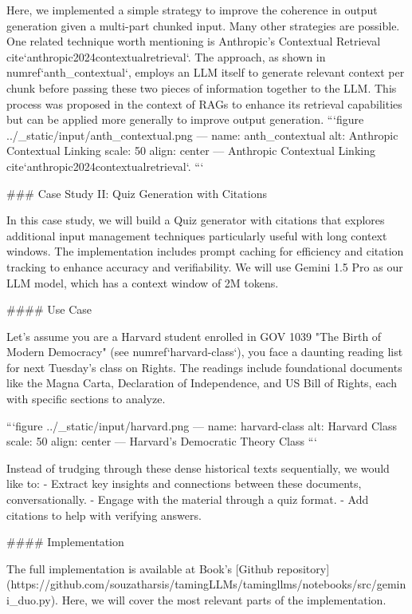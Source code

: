 {{Here, we implemented a simple strategy to improve the coherence in output generation given a multi-part chunked input. Many other strategies are possible. One related technique worth mentioning is Anthropic's Contextual Retrieval {cite}`anthropic2024contextualretrieval`. The approach, as shown in {numref}`anth_contextual`, employs an LLM itself to generate relevant context per chunk before passing these two pieces of information together to the LLM. This process was proposed in the context of RAGs to enhance its retrieval capabilities but can be applied more generally to improve output generation.
```{figure} ../_static/input/anth_contextual.png
---
name: anth_contextual
alt: Anthropic Contextual Linking
scale: 50%
align: center
---
Anthropic Contextual Linking {cite}`anthropic2024contextualretrieval`.
```

### Case Study II: Quiz Generation with Citations

In this case study, we will build a Quiz generator with citations that explores additional input management techniques particularly useful with long context windows. The implementation includes prompt caching for efficiency and citation tracking to enhance accuracy and verifiability. We will use Gemini 1.5 Pro as our LLM model, which has a context window of 2M tokens.

#### Use Case

Let's assume you are a Harvard student enrolled in GOV 1039 "The Birth of Modern Democracy" (see {numref}`harvard-class`), you face a daunting reading list for next Tuesday's class on Rights. The readings include foundational documents like the Magna Carta, Declaration of Independence, and US Bill of Rights, each with specific sections to analyze.

```{figure} ../_static/input/harvard.png
---
name: harvard-class
alt: Harvard Class
scale: 50%
align: center
---
Harvard's Democratic Theory Class
```

Instead of trudging through these dense historical texts sequentially, we would like to:
- Extract key insights and connections between these documents, conversationally.
- Engage with the material through a quiz format.
- Add citations to help with verifying answers.


#### Implementation

The full implementation is available at Book's [Github repository](https://github.com/souzatharsis/tamingLLMs/tamingllms/notebooks/src/gemini_duo.py). Here, we will cover the most relevant parts of the implementation.

}}
